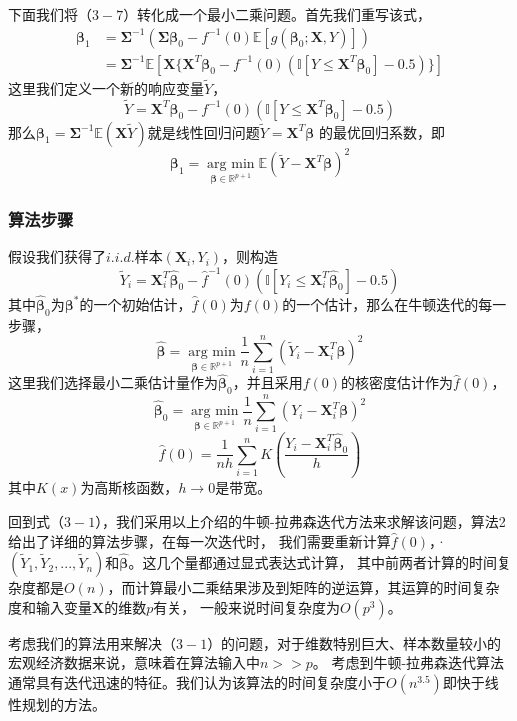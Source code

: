下面我们将（$3-7$）转化成一个最小二乘问题。首先我们重写该式，
\begin{equation*}
    \begin{split}
    \bm{\beta}_1 &= \bm{\Sigma}^{-1}(\bm{\Sigma}\bm{\beta}_0 - f^{-1}(0)\mathbb{E}[g(\bm{\beta}_0;\bm{X},Y)])\\
    &= \bm{\Sigma}^{-1}\mathbb{E}[\bm{X}\{\bm{X}^T\bm{\beta}_0 - f^{-1}(0)(\mathbb{I}[Y \leq \bm{X}^T\bm{\beta}_0] - 0.5)\}]
    \end{split}
\end{equation*}
这里我们定义一个新的响应变量$\tilde Y$，
$$
    \tilde Y = \bm{X}^T\bm{\beta}_0 - f^{-1}(0) (\mathbb{I}[Y \leq \bm{X}^T\bm{\beta}_0] - 0.5)
$$
那么$\bm{\beta}_1 = \bm{\Sigma}^{-1}\mathbb{E}(\bm{X}\tilde{Y})$就是线性回归问题$\tilde Y = \bm{X}^T\bm{\beta}$
的最优回归系数，即
$$
    \bm{\beta}_1 = \underset{\bm{\beta} \in \mathbb{R}^{p+1}}{\operatorname{arg\ min}} 
    \mathbb{E}(\tilde Y - \bm{X}^T \bm{\beta})^2
$$

\subsubsection{算法步骤}
假设我们获得了$i.i.d.$样本$(\bm{X}_i, Y_i)$，则构造
$$
    \tilde{Y}_i = \bm{X}_i^T\hat{\bm{\beta}}_0 - \hat{f}^{-1}(0)
    (\mathbb{I}[Y_i \leq \bm{X}_i^T \hat{\bm{\beta}}_0] - 0.5)
$$
其中$\hat{\bm{\beta}}_0$为$\bm{\beta}^*$的一个初始估计，$\hat{f}(0)$为$f(0)$的一个估计，那么在牛顿迭代的每一步骤，
$$
    \hat{\bm{\beta}} = \underset{\bm{\beta} \in \mathbb{R}^{p+1}}{\operatorname{arg\ min}}
    \frac1{n} \sum_{i=1}^n(\tilde{Y}_i - \bm{X}_i^T\bm{\beta})^2
$$
这里我们选择最小二乘估计量作为$\hat{\bm{\beta}}_0$，并且采用$f(0)$的核密度估计作为$\hat{f}(0)$，
$$
    \hat{\bm{\beta}}_0 = \underset{\bm{\beta} \in \mathbb{R}^{p+1}}{\operatorname {arg\ min}}
    \frac1{n} \sum_{i=1}^n(Y_i - \bm{X}_i^T\bm{\beta})^2
$$
$$
    \hat{f}(0) = \frac1{nh}\sum_{i=1}^nK(\frac{Y_i - \bm{X}^T_i\hat{\bm{\beta}}_0}{h})
$$
其中$K(x)$为高斯核函数，$h \rightarrow 0$是带宽。

回到式（$3-1$），我们采用以上介绍的牛顿-拉弗森迭代方法来求解该问题，算法2给出了详细的算法步骤，在每一次迭代时，
我们需要重新计算$\hat{f}(0)$，·$(\tilde Y_1, \tilde Y_2, ..., \tilde Y_n)$和$\hat{\bm{\beta}}$。这几个量都通过显式表达式计算，
其中前两者计算的时间复杂度都是$O(n)$，而计算最小二乘结果涉及到矩阵的逆运算，其运算的时间复杂度和输入变量$\bm{X}$的维数$p$有关，
一般来说时间复杂度为$O(p^3)$。

考虑我们的算法用来解决（$3-1$）的问题，对于维数特别巨大、样本数量较小的宏观经济数据来说，意味着在算法输入中$n >> p$。
考虑到牛顿-拉弗森迭代算法通常具有迭代迅速的特征。我们认为该算法的时间复杂度小于$O(n^{3.5})$即快于线性规划的方法。



